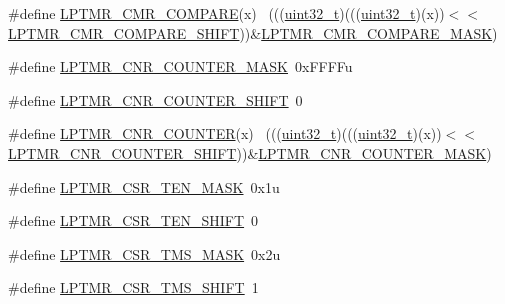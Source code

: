 \begin{DoxyCompactItemize}
\item 
\#define \hyperlink{group___l_p_t_m_r___register___masks_gae5d4cd399ca7bee0964efa18b131a7a9}{L\+P\+T\+M\+R\+\_\+\+C\+M\+R\+\_\+\+C\+O\+M\+P\+A\+RE}(x)                                      ~(((\hyperlink{_p_e___types_8h_a33594304e786b158f3fb30289278f5af}{uint32\+\_\+t})(((\hyperlink{_p_e___types_8h_a33594304e786b158f3fb30289278f5af}{uint32\+\_\+t})(x))$<$$<$\hyperlink{group___l_p_t_m_r___register___masks_gae1a525e22dc8b9c6960ae2e859a64232}{L\+P\+T\+M\+R\+\_\+\+C\+M\+R\+\_\+\+C\+O\+M\+P\+A\+R\+E\+\_\+\+S\+H\+I\+FT}))\&\hyperlink{group___l_p_t_m_r___register___masks_ga55cc95c022500b353f1724f2cbfe7a8f}{L\+P\+T\+M\+R\+\_\+\+C\+M\+R\+\_\+\+C\+O\+M\+P\+A\+R\+E\+\_\+\+M\+A\+SK})
\item 
\#define \hyperlink{group___l_p_t_m_r___register___masks_ga134708aff0fe3bd31d703e32966c08fc}{L\+P\+T\+M\+R\+\_\+\+C\+N\+R\+\_\+\+C\+O\+U\+N\+T\+E\+R\+\_\+\+M\+A\+SK}~0x\+F\+F\+F\+Fu
\item 
\#define \hyperlink{group___l_p_t_m_r___register___masks_ga3769a974a3d95250e32bb154fa134c3f}{L\+P\+T\+M\+R\+\_\+\+C\+N\+R\+\_\+\+C\+O\+U\+N\+T\+E\+R\+\_\+\+S\+H\+I\+FT}~0
\item 
\#define \hyperlink{group___l_p_t_m_r___register___masks_ga2acac25722b0527dbb388488e26850f3}{L\+P\+T\+M\+R\+\_\+\+C\+N\+R\+\_\+\+C\+O\+U\+N\+T\+ER}(x)                                      ~(((\hyperlink{_p_e___types_8h_a33594304e786b158f3fb30289278f5af}{uint32\+\_\+t})(((\hyperlink{_p_e___types_8h_a33594304e786b158f3fb30289278f5af}{uint32\+\_\+t})(x))$<$$<$\hyperlink{group___l_p_t_m_r___register___masks_ga3769a974a3d95250e32bb154fa134c3f}{L\+P\+T\+M\+R\+\_\+\+C\+N\+R\+\_\+\+C\+O\+U\+N\+T\+E\+R\+\_\+\+S\+H\+I\+FT}))\&\hyperlink{group___l_p_t_m_r___register___masks_ga134708aff0fe3bd31d703e32966c08fc}{L\+P\+T\+M\+R\+\_\+\+C\+N\+R\+\_\+\+C\+O\+U\+N\+T\+E\+R\+\_\+\+M\+A\+SK})
\item 
\#define \hyperlink{group___l_p_t_m_r___register___masks_ga4ed197f1cb8d0e954324b4854ff14a83}{L\+P\+T\+M\+R\+\_\+\+C\+S\+R\+\_\+\+T\+E\+N\+\_\+\+M\+A\+SK}~0x1u
\item 
\#define \hyperlink{group___l_p_t_m_r___register___masks_gada00f24f79b11a91e8404b4531d66733}{L\+P\+T\+M\+R\+\_\+\+C\+S\+R\+\_\+\+T\+E\+N\+\_\+\+S\+H\+I\+FT}~0
\item 
\#define \hyperlink{group___l_p_t_m_r___register___masks_ga57ee593a57d844d7bb4b87c127765558}{L\+P\+T\+M\+R\+\_\+\+C\+S\+R\+\_\+\+T\+M\+S\+\_\+\+M\+A\+SK}~0x2u
\item 
\#define \hyperlink{group___l_p_t_m_r___register___masks_gaeac406c6a48e15c6ec5784fb891b51b6}{L\+P\+T\+M\+R\+\_\+\+C\+S\+R\+\_\+\+T\+M\+S\+\_\+\+S\+H\+I\+FT}~1

\end{DoxyCompactItemize}
